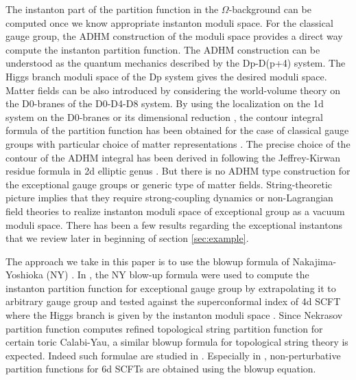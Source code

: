 \documentclass[letterpaper, 11pt]{article}
\begin{document}
The instanton part of the partition function in the $\Omega$-background can be computed once we know appropriate instanton moduli space. For the classical gauge group, the ADHM construction of the moduli space \cite{Atiyah:1978ri} provides a direct way compute the instanton partition function. The ADHM construction can be understood as the quantum mechanics described by the Dp-D(p+4) system. The Higgs branch moduli space of the Dp system gives the desired moduli space. Matter fields can be also introduced by considering the world-volume theory on the D0-branes of the D0-D4-D8 system. 
By using the localization on the 1d system on the D0-branes or its dimensional reduction \cite{Moore:1997dj, Bruzzo:2002xf}, the contour integral formula of the partition function has been obtained for the case of classical gauge groups with particular choice of matter representations \cite{Nekrasov:2004vw, Marino:2004cn, Fucito:2004gi, Hollands:2010xa, Hollands:2011zc}. 
The precise choice of the contour of the ADHM integral has been derived in \cite{Hwang:2014uwa, Hori:2014tda, Cordova:2014oxa} following the Jeffrey-Kirwan residue formula in 2d elliptic genus \cite{Benini:2013xpa,Benini:2013nda}. 
But there is no ADHM type construction for the exceptional gauge groups or generic type of matter fields. String-theoretic picture implies that they require strong-coupling dynamics or non-Lagrangian field theories to realize instanton moduli space of exceptional group as a vacuum moduli space. There has been a few results regarding the exceptional instantons that we review later in beginning of section \ref{sec:example}.

The approach we take in this paper is to use the blowup formula of Nakajima-Yoshioka (NY) \cite{Nakajima:2003pg,Nakajima:2003uh,Nakajima:2005fg, Gottsche:2006bm, Nakajima:2009qjc, Gottsche:2010ig}. In \cite{Keller:2012da}, the NY blow-up formula were used to compute the instanton partition function for exceptional gauge group by extrapolating it to arbitrary gauge group and tested against the superconformal index of 4d SCFT where the Higgs branch is given by the instanton moduli space \cite{Gaiotto:2012uq}. Since Nekrasov partition function computes refined topological string partition function for certain toric Calabi-Yau, a similar blowup formula for topological string theory is expected. Indeed such formulae are studied in \cite{Grassi:2016nnt, Gu:2017ccq, Huang:2017mis, Gu:2018gmy,Gu:2019dan}. Especially in \cite{Gu:2018gmy,Gu:2019dan}, non-perturbative partition functions for 6d SCFTs are obtained using the blowup equation. 
\end{document}
